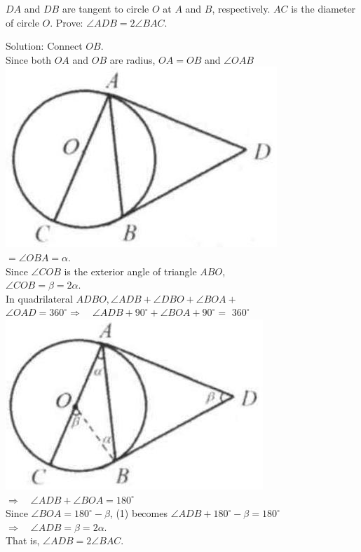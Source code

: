 \documentclass{article}
\begin{document}
\(D A\) and \(D B\) are tangent to circle \(O\) at \(A\) and \(B\), respectively. \(A C\) is the diameter of circle \(O\). Prove: \(\angle A D B=2 \angle B A C\).

Solution:
Connect \(O B\).\\
Since both \(O A\) and \(O B\) are radius, \(O A=O B\) and \(\angle O A B\)\\
\centering
\includegraphics[width=\textwidth]{images/147.jpg}\\
\(=\angle O B A=\alpha\).\\
Since \(\angle C O B\) is the exterior angle of triangle \(A B O\),\\
\(\angle C O B=\beta=2 \alpha\).\\
In quadrilateral \(A D B O, \angle A D B+\angle D B O+\angle B O A+\) \(\angle O A D=360^{\circ} \Rightarrow \quad \angle A D B+90^{\circ}+\angle B O A+90^{\circ}=\) \(360^{\circ}\)\\
\centering
\includegraphics[width=\textwidth]{images/147(3).jpg}\\
\(\Rightarrow \quad \angle A D B+\angle B O A=180^{\circ}\)\\
Since \(\angle B O A=180^{\circ}-\beta\), (1) becomes \(\angle A D B+180^{\circ}-\beta=180^{\circ}\)\\
\(\Rightarrow \quad \angle A D B=\beta=2 \alpha\).\\
That is, \(\angle A D B=2 \angle B A C\).
\end{document}
